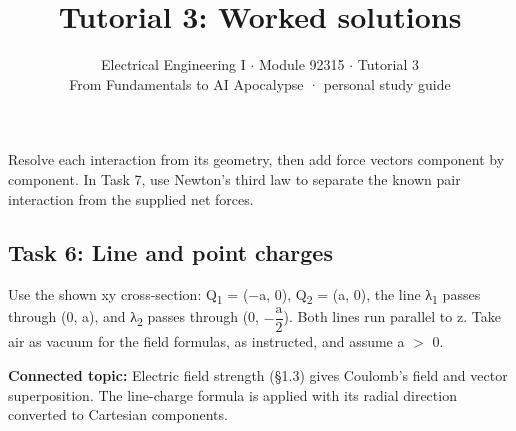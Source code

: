 \documentclass[11pt]{article}
\title{\sffamily\bfseries\color{FAUblue}Tutorial 3: Worked solutions}
\author{Electrical Engineering I \ensuremath{\cdot} Module 92315 \ensuremath{\cdot} Tutorial 3\\[2pt]\small From Fundamentals to AI Apocalypse · personal study guide}
\date{}
\begin{document}
\maketitle
\begingroup\footnotesize\setlength{\parskip}{0pt}\tableofcontents\endgroup
\clearpage

{\large Resolve each interaction from its geometry, then add force vectors component by component. In Task 7, use Newton’s third law to separate the known pair interaction from the supplied net forces.}


\begin{keepsection}
\section{Task 6: Line and point charges}

Use the shown xy cross-section: Q\textsubscript{1} = (\ensuremath{-}a, 0), Q\textsubscript{2} = (a, 0), the line λ\textsubscript{1} passes through (0, a), and λ\textsubscript{2} passes through (0, \ensuremath{-}{\small\ensuremath{\dfrac{\mathrm{a}}{2}}}). Both lines run parallel to z. Take air as vacuum for the field formulas, as instructed, and assume a \ensuremath{>} 0.

\textbf{Connected topic:} Electric field strength (§1.3) gives Coulomb’s field and vector superposition. The line-charge formula is applied with its radial direction converted to Cartesian components.


\end{keepsection}
\end{document}
